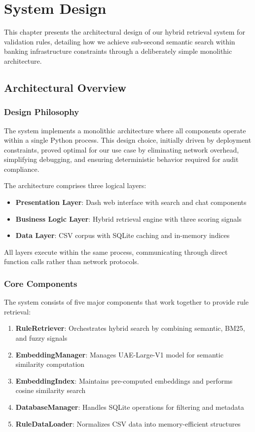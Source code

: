 \chapter{System Design}
\label{ch:system-design}

This chapter presents the architectural design of our hybrid retrieval system for validation rules, detailing how we achieve sub-second semantic search within banking infrastructure constraints through a deliberately simple monolithic architecture.

\section{Architectural Overview}

\subsection{Design Philosophy}

The system implements a monolithic architecture where all components operate within a single Python process. This design choice, initially driven by deployment constraints, proved optimal for our use case by eliminating network overhead, simplifying debugging, and ensuring deterministic behavior required for audit compliance.

The architecture comprises three logical layers:
\begin{itemize}[leftmargin=*,itemsep=2pt,topsep=2pt]
  \item \textbf{Presentation Layer}: Dash web interface with search and chat components
  \item \textbf{Business Logic Layer}: Hybrid retrieval engine with three scoring signals
  \item \textbf{Data Layer}: CSV corpus with SQLite caching and in-memory indices
\end{itemize}

All layers execute within the same process, communicating through direct function calls rather than network protocols.

\subsection{Core Components}

The system consists of five major components that work together to provide rule retrieval:

\begin{enumerate}[leftmargin=*,itemsep=2pt,topsep=2pt]
  \item \textbf{RuleRetriever}: Orchestrates hybrid search by combining semantic, BM25, and fuzzy signals
  \item \textbf{EmbeddingManager}: Manages UAE-Large-V1 model for semantic similarity computation
  \item \textbf{EmbeddingIndex}: Maintains pre-computed embeddings and performs cosine similarity search
  \item \textbf{DatabaseManager}: Handles SQLite operations for filtering and metadata
  \item \textbf{RuleDataLoader}: Normalizes CSV data into memory-efficient structures
\end{enumerate}

